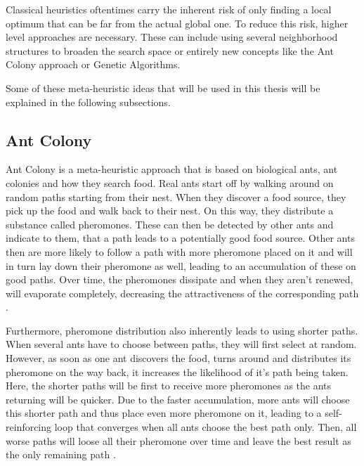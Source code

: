 Classical heuristics oftentimes carry the inherent risk of only finding a local optimum that can be far from the actual global one.
To reduce this risk, higher level approaches are necessary.
These can include using several neighborhood structures to broaden the search space or entirely new concepts like the Ant Colony approach or Genetic Algorithms. \cite{gendreau_handbook_2010}

Some of these meta-heuristic ideas that will be used in this thesis will be explained in the following subsections.



\subsection{Ant Colony}
\label{subsec:antColonyBackground}

Ant Colony is a meta-heuristic approach that is based on biological ants, ant colonies and how they search food.
Real ants start off by walking around on random paths starting from their nest. 
When they discover a food source, they pick up the food and walk back to their nest.
On this way, they distribute a substance called pheromones.
These can then be detected by other ants and indicate to them, that a path leads to a potentially good food source. 
Other ants then are more likely to follow a path with more pheromone placed on it and will in turn lay down their pheromone as well, leading to an accumulation of these on good paths.
Over time, the pheromones dissipate and when they aren't renewed, will evaporate completely, decreasing the attractiveness of the corresponding path \cite{gendreau_handbook_2010, dorigo_ant_1996}. 

Furthermore, pheromone distribution also inherently leads to using shorter paths. 
When several ants have to choose between paths, they will first select at random.
However, as soon as one ant discovers the food, turns around and distributes its pheromone on the way back, it increases the likelihood of it's path being taken.
Here, the shorter paths will be first to receive more pheromones as the ants returning will be quicker.
Due to the faster accumulation, more ants will choose this shorter path and thus place even more pheromone on it, leading to a self-reinforcing loop that converges when all ants choose the best path only.
Then, all worse paths will loose all their pheromone over time and leave the best result as the only remaining path \cite{gendreau_handbook_2010, dorigo_ant_1996}.

